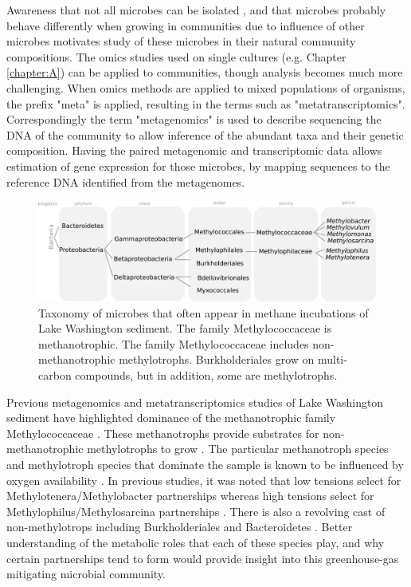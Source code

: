 Awareness that not all microbes can be isolated \cite{kaeberlein2002, stewart2012}, and that microbes probably behave differently when growing in communities due to influence of other microbes \cite{yu2016synthetic} motivates study of these microbes in their natural community compositions.
The omics studies used on single cultures (e.g. Chapter \ref{chapter:A}) can be applied to communities, though analysis becomes much more challenging.
When omics methods are applied to mixed populations of organisms, the prefix "meta" is applied, resulting in the terms such as  "metatranscriptomics".
Correspondingly the term "metagenomics" is used to describe sequencing the DNA of the community to allow inference of the abundant taxa and their genetic composition.
Having the paired metagenomic and transcriptomic data allows estimation of gene expression for those microbes, by mapping sequences to the reference DNA identified from the metagenomes.

\begin{figure}[H]
\centering
     \includegraphics[width=1.0\textwidth]{./tex/chapter2/figures/170311_taxonomy_overview.pdf}
     \begin{singlespace}
     \caption[Taxonomy of microbes known to factor into methane oxidation in Lake Washington sediment.]{
        Taxonomy of microbes that often appear in methane incubations of Lake Washington sediment.
        The family Methylococcaceae is methanotrophic.
        The family Methylococcaceae includes non-methanotrophic methylotrophs.
        Burkholderiales grow on multi-carbon compounds, but in addition, some are methylotrophs.}
     \label{fig:taxonomy}
     \end{singlespace}
\end{figure}

Previous metagenomics and metatranscriptomics studies of Lake Washington sediment have highlighted dominance of the methanotrophic family Methylococcaceae \cite{beck2013LW, beck2014LW, oshkin2015LW, hernandez2015LW}.
These methanotrophs provide substrates for non-methanotrophic methylotrophs to grow \cite{beck2013LW}.
The particular methanotroph species and methylotroph species that dominate the sample is known to be influenced by oxygen availability \cite{hernandez2015LW}.
In previous studies, it was noted that low  tensions select for Methylotenera/Methylobacter partnerships whereas high  tensions select for Methylophilus/Methylosarcina partnerships \cite{hernandez2015LW}.
There is also a revolving cast of non-methylotrops including Burkholderiales and Bacteroidetes \cite{kalyuzhnaya2008Burkholderiales, beck2014LW}.
Better understanding of the metabolic roles that each of these species play, and why certain partnerships tend to form would provide insight into this greenhouse-gas mitigating microbial community.

